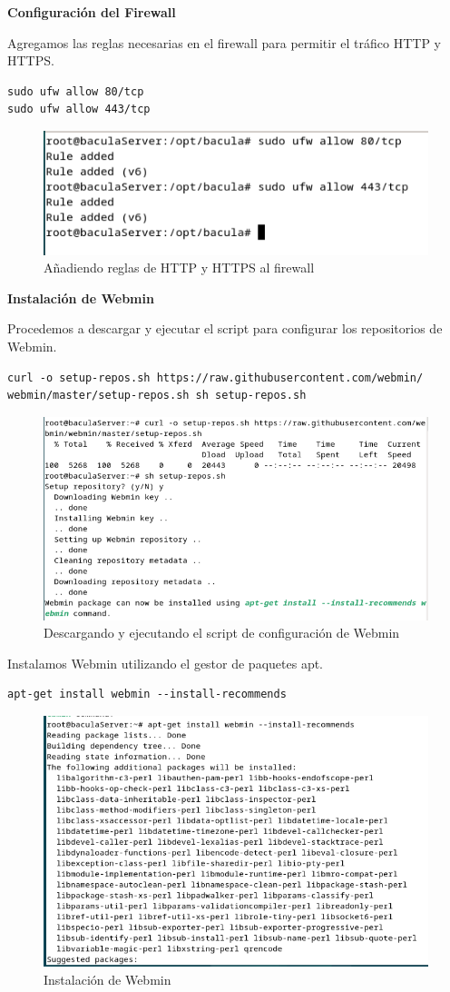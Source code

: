 \textbf{Configuración del Firewall}
\medskip

Agregamos las reglas necesarias en el firewall para permitir el tráfico HTTP y HTTPS.
\begin{verbatim}
sudo ufw allow 80/tcp
sudo ufw allow 443/tcp
\end{verbatim}

\begin{figure}[H]
    \centering
    \includegraphics[width=0.5\linewidth]{instalacionBacula/htpsFirewall.png}
    \caption{Añadiendo reglas de HTTP y HTTPS al firewall}
\end{figure}

\textbf{Instalación de Webmin}
\medskip

Procedemos a descargar y ejecutar el script para configurar los repositorios de Webmin.
\begin{verbatim}
curl -o setup-repos.sh https://raw.githubusercontent.com/webmin/
webmin/master/setup-repos.sh sh setup-repos.sh
\end{verbatim}

\begin{figure}[H]
    \centering
    \includegraphics[width=0.5\linewidth]{instalacionBacula/CURLwebmin.png}
    \caption{Descargando y ejecutando el script de configuración de Webmin}
\end{figure}

Instalamos Webmin utilizando el gestor de paquetes apt.
\begin{verbatim}
apt-get install webmin --install-recommends
\end{verbatim}

\begin{figure}[H]
    \centering
    \includegraphics[width=0.5\linewidth]{instalacionBacula/instalWebminn.png}
    \caption{Instalación de Webmin}
\end{figure}

